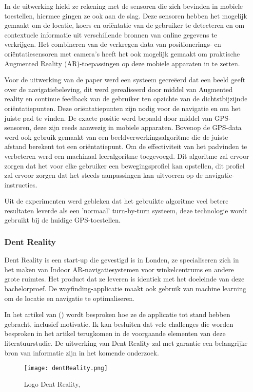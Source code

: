 In de uitwerking hield ze rekening met de sensoren die zich bevinden in mobiele toestellen, hiermee gingen ze ook aan de slag. Deze sensoren hebben het mogelijk gemaakt om de locatie, koers en oriëntatie van de gebruiker te detecteren en om contextuele informatie uit verschillende bronnen van online gegevens te verkrijgen. Het combineren van de verkregen data van positionerings- en oriëntatiesensoren met camera's heeft het ook mogelijk gemaakt om praktische Augmented Reality (AR)-toepassingen op deze mobiele apparaten in te zetten. 

Voor de uitwerking van de paper werd een systeem gecreëerd dat een beeld geeft over de navigatiebeleving, dit werd gerealiseerd door middel van Augmented reality en continue feedback van de gebruiker ten opzichte van de dichtstbijzijnde oriëntatiepunten. Deze oriëntatiepunten zijn nodig voor de navigatie en om het juiste pad te vinden. De exacte positie werd bepaald door middel van GPS-sensoren, deze zijn reeds aanwezig in mobiele apparaten. Bovenop de GPS-data werd ook gebruik gemaakt van een beeldverwerkingsalgoritme die de juiste afstand berekent tot een oriëntatiepunt. Om de effectiviteit van het padvinden te verbeteren werd een machinaal leeralgoritme toegevoegd. Dit algoritme zal ervoor zorgen dat het voor elke gebruiker een bewegingsprofiel kan opstellen, dit profiel zal ervoor zorgen dat het steeds aanpassingen kan uitvoeren op de navigatie-instructies.

Uit de experimenten werd gebleken dat het gebruikte algoritme veel betere resultaten leverde als een 'normaal' turn-by-turn systeem, deze technologie wordt gebruikt bij de huidige GPS-toestellen.

\subsubsection{Dent Reality}
Dent Reality is een start-up die gevestigd is in Londen, ze specialiseren zich in het maken van Indoor AR-navigatiesystemen voor winkelcentrums en andere grote ruimtes. Het product dat ze leveren is identiek met het doeleinde van deze bachelorproef. De wayfinding-applicatie maakt ook gebruik van machine learning om de locatie en navigatie te optimaliseren.

In het artikel van \textcite{Hart2019} () wordt besproken hoe ze de applicatie tot stand hebben gebracht, inclusief motivatie. Ik kan besluiten dat vele challenges die worden besproken in het artikel terugkomen in de voorgaande elementen van deze literatuurstudie. De uitwerking van Dent Reality zal met garantie een belangrijke bron van informatie zijn in het komende onderzoek.

\begin{figure}[H]
	\centering
	\texttt{[image: dentReality.png]}
	\caption{Logo Dent Reality, \autocite{Hart2019}}
\end{figure}

